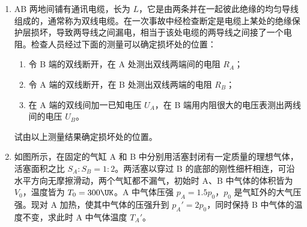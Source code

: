 \documentclass[\gkver]{gaokaozhenti}
\begin{document}
\begin{enumerate}
{\begin{enumerate}
	\item
	光路图如图所示，$\theta_{c}$ 为临界角。

	\item
	$\sin\theta_{c} = \frac{1}{n}$
\end{enumerate}
}


\item
AB 两地间铺有通讯电缆，长为 $L$，它是由两条并在一起彼此绝缘的均匀导线组成的，通常称为双线电缆。在一次事故中经检查断定是电缆上某处的绝缘保护层损坏，导致两导线之间漏电，相当于该处电缆的两导线之间接了一个电阻。检查人员经过下面的测量可以确定损坏处的位置：

\begin{enumerate}
\item
令 B 端的双线断开，在 A 处测出双线两端间的电阻 $R_{A}$；

\item
令 A 端的双线断开，在 B 处测出双线两端的电阻 $R_{B}$；

\item
在 A 端的双线间加一已知电压 $U_{A}$，在 B 端用内阻很大的电压表测出两线间的电压 $U_{B}$。
\end{enumerate}
试由以上测量结果确定损坏处的位置。



\item
如图所示，在固定的气缸 A 和 B 中分别用活塞封闭有一定质量的理想气体，活塞面积之比 $S_{A}:S_{B} = 1:2$。两活塞以穿过 B 的底部的刚性细杆相连，可沿水平方向无摩擦滑动，两个气缸都不漏气，初始时 A、B 中气体的体积皆为 $V_{0}$，温度皆为 $T_{0} = 300\UK$。A 中气体压强 $p_{A} = 1.5p_{0}$，$p_{0}$ 是气缸外的大气压强。现对 A 加热，使其中气体的压强升到 $p_{A}' = 2p_{0}$，同时保持 B 中气体的温度不变，求此时 A 中气体温度 $T_{A}'$。


\end{enumerate}
\end{document}
